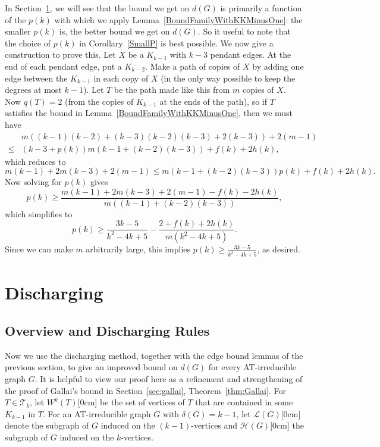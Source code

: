 \documentclass[12pt]{article}
\theoremstyle{plain}
\theoremstyle{definition}
\theoremstyle{remark}
\newcommand{\fancy}[1]{\mathcal{#1}}
\newcommand{\T}{\fancy{T}}
\renewcommand{\L}{\fancy{L}}
\newcommand{\HH}{\fancy{H}}
\newcommand{\aside}[1]{\marginnote{\scriptsize{#1}}[0cm]}
\begin{document}
In Section~\ref{discharging}, we will see that the bound we get on $d(G)$ is
primarily a function of the $p(k)$ with which we apply
Lemma~\ref{BoundFamilyWithKKMinusOne}: the smaller $p(k)$ is, the better bound
we get on $d(G)$.  So it useful to note that the choice of $p(k)$ in
Corollary~\ref{SmallP} is best possible.  We now give a construction to prove
this.  Let $X$ be a $K_{k-1}$ with $k-3$ pendant edges.  At the end of each
pendant edge, put a $K_{k-2}$.  Make a path of copies of $X$ by adding one edge
between the $K_{k-1}$ in each copy of $X$ (in the only way possible to keep the
degrees at most $k-1$).  Let $T$ be the path made like this from $m$ copies of
$X$.  Now $q(T) = 2$ (from the copies of $K_{k-1}$ at the ends of the path), so
if $T$ satisfies the bound in Lemma~\ref{BoundFamilyWithKKMinusOne}, then we
must have
\begin{align*}
&m((k-1)(k-2) + (k-3)(k-2)(k-3) + 2(k-3)) + 2(m-1) \\
\le &(k-3 + p(k))m(k-1+(k-2)(k-3)) + f(k) + 2h(k),
\end{align*}
which reduces to
\[m(k-1) + 2m(k-3) + 2(m-1) \le m(k-1+(k-2)(k-3))p(k) + f(k) + 2h(k).\]
Now solving for $p(k)$ gives
\[p(k) \ge \frac{m(k-1)+2m(k-3)+2(m-1)-f(k)-2h(k)}{m((k-1)+(k-2)(k-3))},\] 
which simplifies to
\[p(k) \ge \frac{3k - 5}{k^2 - 4k + 5}-\frac{2+f(k)+2h(k)}{m(k^2-4k+5)}.\]
Since we can make $m$ arbitrarily large, this implies $p(k)\ge \frac{3k-5}{k^2-4k+5}$, as desired.

\section{Discharging}\label{discharging}

\subsection{Overview and Discharging Rules}
\label{discharging-overview}

Now we use the discharging method, together with the edge bound lemmas of the
previous section, to give an improved bound on $d(G)$ for every AT-irreducible graph $G$.  
It is helpful to view our proof here as a refinement and
strengthening of the proof of Gallai's bound in Section~\ref{sec:gallai},
Theorem~\ref{thm:Gallai}.
For $T \in \T_k$, let $W^k(T)$\aside{$W^k(T)$} be the set of vertices of $T$
that are contained in some $K_{k-1}$ in $T$.  For an AT-irreducible graph $G$ with $\delta(G) = k-1$,
let $\L(G)$\aside{$\L(G)$} denote the subgraph of $G$ induced on the
$(k-1)$-vertices and $\HH(G)$\aside{$\HH(G)$} the subgraph of $G$ induced on
the $k$-vertices.     
\end{document}
